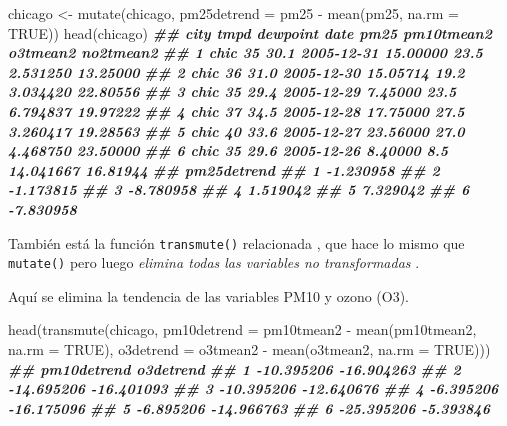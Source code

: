 \documentclass[
]{book}
\newenvironment{Shaded}{\begin{snugshade}}{\end{snugshade}}
\newcommand{\AttributeTok}[1]{\textcolor[rgb]{0.77,0.63,0.00}{#1}}
\newcommand{\ConstantTok}[1]{\textcolor[rgb]{0.00,0.00,0.00}{#1}}
\newcommand{\DocumentationTok}[1]{\textcolor[rgb]{0.56,0.35,0.01}{\textbf{\textit{#1}}}}
\newcommand{\FunctionTok}[1]{\textcolor[rgb]{0.00,0.00,0.00}{#1}}
\newcommand{\NormalTok}[1]{#1}
\newcommand{\OtherTok}[1]{\textcolor[rgb]{0.56,0.35,0.01}{#1}}
\newcommand{\SpecialCharTok}[1]{\textcolor[rgb]{0.00,0.00,0.00}{#1}}
\begin{document}
\begin{Shaded}
\begin{Highlighting}[]
\NormalTok{chicago }\OtherTok{\textless{}{-}} \FunctionTok{mutate}\NormalTok{(chicago, }\AttributeTok{pm25detrend =}\NormalTok{ pm25 }\SpecialCharTok{{-}} \FunctionTok{mean}\NormalTok{(pm25, }\AttributeTok{na.rm =} \ConstantTok{TRUE}\NormalTok{))}
\FunctionTok{head}\NormalTok{(chicago)}
\DocumentationTok{\#\#   city tmpd dewpoint       date     pm25 pm10tmean2  o3tmean2 no2tmean2}
\DocumentationTok{\#\# 1 chic   35     30.1 2005{-}12{-}31 15.00000       23.5  2.531250  13.25000}
\DocumentationTok{\#\# 2 chic   36     31.0 2005{-}12{-}30 15.05714       19.2  3.034420  22.80556}
\DocumentationTok{\#\# 3 chic   35     29.4 2005{-}12{-}29  7.45000       23.5  6.794837  19.97222}
\DocumentationTok{\#\# 4 chic   37     34.5 2005{-}12{-}28 17.75000       27.5  3.260417  19.28563}
\DocumentationTok{\#\# 5 chic   40     33.6 2005{-}12{-}27 23.56000       27.0  4.468750  23.50000}
\DocumentationTok{\#\# 6 chic   35     29.6 2005{-}12{-}26  8.40000        8.5 14.041667  16.81944}
\DocumentationTok{\#\#   pm25detrend}
\DocumentationTok{\#\# 1   {-}1.230958}
\DocumentationTok{\#\# 2   {-}1.173815}
\DocumentationTok{\#\# 3   {-}8.780958}
\DocumentationTok{\#\# 4    1.519042}
\DocumentationTok{\#\# 5    7.329042}
\DocumentationTok{\#\# 6   {-}7.830958}
\end{Highlighting}
\end{Shaded}

También está la función \texttt{transmute()} relacionada , que hace lo mismo que \texttt{mutate()} pero luego \emph{elimina todas las variables no transformadas} .

Aquí se elimina la tendencia de las variables PM10 y ozono (O3).

\begin{Shaded}
\begin{Highlighting}[]
\FunctionTok{head}\NormalTok{(}\FunctionTok{transmute}\NormalTok{(chicago, }
               \AttributeTok{pm10detrend =}\NormalTok{ pm10tmean2 }\SpecialCharTok{{-}} \FunctionTok{mean}\NormalTok{(pm10tmean2, }\AttributeTok{na.rm =} \ConstantTok{TRUE}\NormalTok{),}
               \AttributeTok{o3detrend =}\NormalTok{ o3tmean2 }\SpecialCharTok{{-}} \FunctionTok{mean}\NormalTok{(o3tmean2, }\AttributeTok{na.rm =} \ConstantTok{TRUE}\NormalTok{)))}
\DocumentationTok{\#\#   pm10detrend  o3detrend}
\DocumentationTok{\#\# 1  {-}10.395206 {-}16.904263}
\DocumentationTok{\#\# 2  {-}14.695206 {-}16.401093}
\DocumentationTok{\#\# 3  {-}10.395206 {-}12.640676}
\DocumentationTok{\#\# 4   {-}6.395206 {-}16.175096}
\DocumentationTok{\#\# 5   {-}6.895206 {-}14.966763}
\DocumentationTok{\#\# 6  {-}25.395206  {-}5.393846}
\end{Highlighting}
\end{Shaded}
\end{document}
